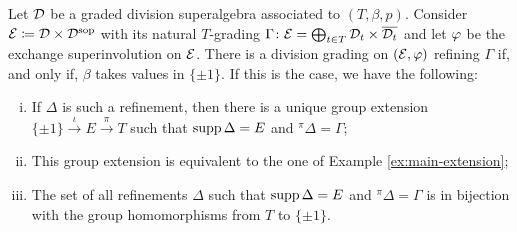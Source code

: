 \begin{thm}\label{thm:refinement-DxDsop}
    Let $\mathcal{D}$ be a graded division superalgebra associated to $(T, \beta, p)$.  
    Consider $\mathcal E \coloneqq \mathcal{D} \times \mathcal{D}^{\mathrm{sop}}$ with its natural $T$-grading $\Gamma\colon \mathcal E = \bigoplus_{t\in T} \mathcal{D}_t \times \overline{\mathcal{D}_t}$ and let $\varphi$ be the exchange superinvolution on $\mathcal E$. 
    There is a division grading on $(\mathcal E, \varphi)$ refining $\Gamma$ if, and only if, $\beta$ takes values in $\{ \pm 1 \}$. 
    If this is the case, we have the following:
    
    \begin{enumerate}[(i)]
        
        \item %
        If $\Delta$ is such a refinement, then there is a unique group extension $\{ \pm 1 \} \xrightarrow{\iota} E \xrightarrow{\pi} T$ such that $\operatorname{supp} \Delta = E$ and ${}^{\pi} \Delta = \Gamma$; \label{item:there-is-extension}
        
        \item This group extension is equivalent to the one of Example \ref{ex:main-extension}; \label{item:equivalent-extension-example}
        
        \item The set of all refinements $\Delta$ such that $\operatorname{supp} \Delta = E$ and ${}^\pi \Delta = \Gamma$ is in bijection with the group homomorphisms from $T$ to $\{ \pm 1 \}$. \label{item:number-of-extensions}
    \end{enumerate}
\end{thm}

